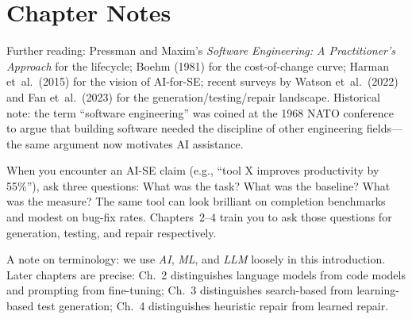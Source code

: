 \section{Chapter Notes}
Further reading: Pressman and Maxim's \emph{Software Engineering: A Practitioner's Approach} for the lifecycle; Boehm (1981) for the cost-of-change curve; Harman et~al.\ (2015) for the vision of AI-for-SE; recent surveys by Watson et~al.\ (2022) and Fan et~al.\ (2023) for the generation/testing/repair landscape. Historical note: the term ``software engineering'' was coined at the 1968 NATO conference to argue that building software needed the discipline of other engineering fields---the same argument now motivates AI assistance.

\begin{remark}
When you encounter an AI-SE claim (e.g., ``tool X improves productivity by 55\%''), ask three questions: What was the task? What was the baseline? What was the measure? The same tool can look brilliant on completion benchmarks and modest on bug-fix rates. Chapters~2--4 train you to ask those questions for generation, testing, and repair respectively.
\end{remark}

A note on terminology: we use \emph{AI}, \emph{ML}, and \emph{LLM} loosely in this introduction. Later chapters are precise: Ch.~2 distinguishes language models from code models and prompting from fine-tuning; Ch.~3 distinguishes search-based from learning-based test generation; Ch.~4 distinguishes heuristic repair from learned repair.

